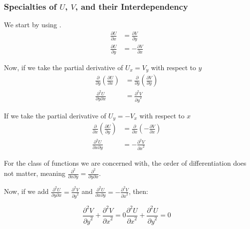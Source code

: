 \subsubsection{Specialties of $U$, $V$, and their Interdependency}\label{subsubsec:Special_U_V_Interdependency}
We start by using .
\begin{align*}
  \frac{\partial U}{\partial x} &= \frac{\partial V}{\partial y} \\
  \frac{\partial U}{\partial y} &= -\frac{\partial V}{\partial x}
\end{align*}

Now, if we take the partial derivative of $U_{x} = V_{y}$ with respect to $y$
\begin{align*}
  \frac{\partial}{\partial y} \left( \frac{\partial U}{\partial x} \right) &= \frac{\partial}{\partial y} \left( \frac{\partial V}{\partial y} \right) \\
  \frac{\partial^{2} U}{\partial y \partial x} &= \frac{\partial^{2} V}{{\partial y}^{2}}
\end{align*}

If we take the partial derivative of $U_{y} = -V_{x}$ with respect to $x$
\begin{align*}
  \frac{\partial}{\partial x} \left( \frac{\partial U}{\partial y} \right) &= \frac{\partial}{\partial x} \left( -\frac{\partial V}{\partial x} \right) \\
  \frac{\partial^{2} U}{\partial x \partial y} &= -\frac{\partial^{2} V}{{\partial x}^{2}}
\end{align*}

For the class of functions we are concerned with, the order of differentiation does not matter, meaning $\frac{\partial^{2}}{\partial x \partial y} = \frac{\partial^{2}}{\partial y \partial x}$.

Now, if we add $\frac{\partial^{2} U}{\partial y \partial x} = \frac{\partial^{2} V}{{\partial y}^{2}}$ and $\frac{\partial^{2} U}{\partial x \partial y} = -\frac{\partial^{2} V}{{\partial x}^{2}}$, then:

\begin{subequations}\label{eq:U_V_Harmonic_Relation}
  \begin{equation}\label{subeq:U_V_Harmonic_Relation-V}
    \frac{\partial^{2} V}{{\partial y}^{2}} + \frac{\partial^{2} V}{{\partial x}^{2}} = 0
  \end{equation}
  \begin{equation}\label{subeq:U_V_Harmonic_Relation-U}
    \frac{\partial^{2} U}{{\partial x}^{2}} + \frac{\partial^{2} U}{{\partial y}^{2}} = 0
  \end{equation}
\end{subequations}

